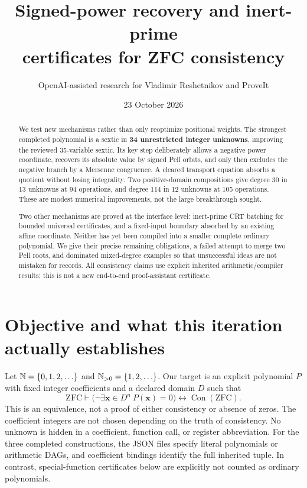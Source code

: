 \documentclass[11pt]{article}
\title{Signed-power recovery and inert-prime\\certificates for ZFC consistency}
\author{OpenAI-assisted research for Vladimir Reshetnikov and ProveIt}
\date{23 October 2026}
\newcommand{\Con}{\operatorname{Con}}
\begin{document}
\maketitle
\begin{abstract}
We test new mechanisms rather than only reoptimize positional weights. The
strongest completed polynomial is a sextic in \textbf{34 unrestricted integer
unknowns}, improving the reviewed 35-variable sextic. Its key step deliberately
allows a negative power coordinate, recovers its absolute value by signed Pell
orbits, and only then excludes the negative branch by a Mersenne congruence.
A cleared transport equation absorbs a quotient without losing integrality.
Two positive-domain compositions give degree 30 in 13 unknowns at 94 operations,
and degree 114 in 12 unknowns at 105 operations. These are modest numerical
improvements, not the large breakthrough sought.

Two other mechanisms are proved at the interface level: inert-prime CRT
batching for bounded universal certificates, and a fixed-input boundary
absorbed by an existing affine coordinate. Neither has yet been compiled
into a smaller complete ordinary polynomial. We give their precise remaining
obligations, a failed attempt to merge two Pell roots, and dominated
mixed-degree examples so that unsuccessful ideas are not mistaken for
records. All consistency claims use explicit inherited arithmetic/compiler
results; this is not a new end-to-end proof-assistant certificate.
\end{abstract}
\tableofcontents
\section{Objective and what this iteration actually establishes}
Let $\mathbb N=\{0,1,2,\ldots\}$ and $\mathbb N_{>0}=\{1,2,\ldots\}$. Our target is an
explicit polynomial $P$ with fixed integer coefficients and a declared domain
$D$ such that
\[
\mathrm{ZFC}\vdash
\bigl(\neg\exists \boldsymbol{x}\in D^n\ P(\boldsymbol{x})=0\bigr)
\longleftrightarrow\Con(\mathrm{ZFC}).
\]
This is an equivalence, not a proof of either consistency or absence of zeros.
The coefficient integers are not chosen depending on the truth of consistency.
No unknown is hidden in a coefficient, function call, or register abbreviation.
For the three completed constructions, the JSON files specify literal
polynomials or arithmetic DAGs, and coefficient bindings identify the full
inherited tuple. In contrast, special-function certificates below are
explicitly not counted as ordinary polynomials.
\end{document}
